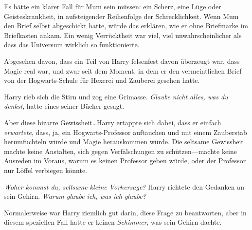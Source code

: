 Es hätte ein klarer Fall für Mum sein müssen: ein Scherz, eine Lüge oder Geisteskrankheit, in aufsteigender Reihenfolge der Schrecklichkeit. Wenn Mum den Brief selbst abgeschickt hatte, würde das erklären, wie er ohne Briefmarke im Briefkasten ankam. Ein wenig Verrücktheit war viel, viel unwahrscheinlicher als dass das Universum wirklich so funktionierte.

Abgesehen davon, dass ein Teil von Harry felsenfest davon überzeugt war, dass Magie real war, und zwar seit dem Moment, in dem er den vermeintlichen Brief von der Hogwarts-Schule für Hexerei und Zauberei gesehen hatte.

Harry rieb sich die Stirn und zog eine Grimasse. \emph{Glaube nicht alles, was du denkst}, hatte eines seiner Bücher gesagt.

Aber diese bizarre Gewissheit…Harry ertappte sich dabei, dass er einfach \emph{erwartete}, dass, ja, ein Hogwarts-Professor auftauchen und mit einem Zauberstab herumfuchteln würde und Magie herauskommen würde. Die seltsame Gewissheit machte keine Anstalten, sich gegen Verfälschungen zu schützen—machte keine Ausreden im Voraus, warum es keinen Professor geben würde, oder der Professor nur Löffel verbiegen könnte.

\emph{Woher kommst du, seltsame kleine Vorhersage?} Harry richtete den Gedanken an sein Gehirn. \emph{Warum glaube ich, was ich glaube?}

Normalerweise war Harry ziemlich gut darin, diese Frage zu beantworten, aber in diesem speziellen Fall hatte er keinen \emph{Schimmer}, was sein Gehirn dachte.

